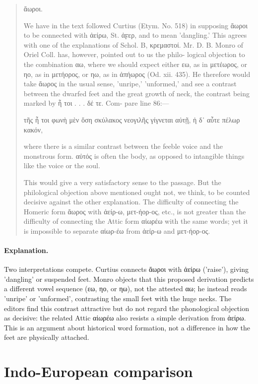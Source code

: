 \begin{quote}
ἄωροι.

We have in the text followed Curtius (Etym. No. 518) in supposing
ἄωροι to be connected with ἀείρω, St. ἀϝερ, and to mean 'dangling.'
This agrees with one of the explanations of Schol. B, κρεμαστοί. Mr.
D. B. Monro of Oriel Coll. has, however, pointed out to us the philo-
logical objection to the combination αω, where we should expect either
εω, as in μετέωρος, or ηο, as in μετήορος, or ηω, as in ἀπήωρος (Od. xii.
435). He therefore would take ἄωρος in the usual sense, 'unripe,'
'unformed,' and see a contrast between the dwarfed feet and the great
growth of neck, the contrast being marked by ἦ τοι . . . δέ τε. Com-
pare line 86:—

τῆς ἦ τοι φωνὴ μὲν ὅση σκύλακος νεογιλῆς
γίγνεται αὐτῇ, ἡ δ᾽ αὖτε πέλωρ κακόν,

where there is a similar contrast between the feeble voice and the
monstrous form. αὐτός is often the body, as opposed to intangible
things like the voice or the soul.

This would give a very satisfactory sense to the passage. But the
philological objection above mentioned ought not, we think, to be counted
decisive against the other explanation. The difficulty of connecting the
Homeric form ἄωρος with ἀείρ-ω, μετ-ήορ-ος, etc., is not greater than
the difficulty of connecting the Attic form αἰωρέω with the same words;
yet it is impossible to separate αἰωρ-έω from ἀείρ-ω and μετ-ήορ-ος.
\end{quote}

\paragraph{Explanation.} Two interpretations compete. Curtius connects
ἄωροι with ἀείρω ('raise'), giving 'dangling' or suspended feet.
Monro objects that this proposed derivation predicts a different vowel
sequence (εω, ηο, or ηω), not the attested αω; he instead reads
'unripe' or 'unformed', contrasting the small feet with the huge necks.
The editors find this contrast attractive but do not regard the phonological
objection as decisive: the related Attic αἰωρέω also resists a simple
derivation from ἀείρω. This is an argument about historical word formation,
not a difference in how the feet are physically attached.

\section{Indo-European comparison}
\label{section-indo-european-comparison}

